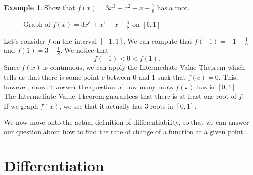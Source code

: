 \documentclass[12pt]{article}
\theoremstyle{definition}
\newtheorem{exmp}[thm]{Example}
\theoremstyle{plain}
\numberwithin{equation}{section}
\begin{document}
\begin{exmp}
Show that $f(x)=3x^3+x^2-x-\frac{1}{8}$ has a root.\\

\begin{figure}
  \centering
  \caption{Graph of $f(x)=3x^3+x^2-x-\frac{1}{8}$ on $[0,1]$}
\end{figure}

Let's consider $f$ on the interval $[-1,1]$. We can compute that $f(-1)=-1-\frac{1}{8}$ and $f(1)=3-\frac{1}{8}$. We notice that
\[
f(-1)<0<f(1).
\] Since $f(x)$ is continuous, we can apply the Intermediate Value Theorem which tells us that there is some point $c$ between $0$ and $1$ such that $f(c)=0$. This, however, doesn't answer the question of how many roots $f(x)$ has in $[0,1]$. The Intermediate Value Theorem guarantees that there is at least one root of $f$. If we graph $f(x)$, we see that it actually has 3 roots in $[0,1]$.
\end{exmp}









We now move onto the actual definition of differentiability, so that we can answer our question about how to find the rate of change of a function at a given point.

\section{Differentiation}
\end{document}
